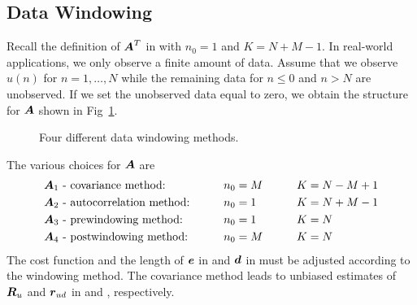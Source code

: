 \subsection{Data Windowing}
Recall the definition of $\boldsymbol{A}^T$ in  with $n_0=1$ and $K=N+M-1$.
\bmathnt
{}
\emathnt
In real-world applications, we only observe a finite amount of data. Assume that we observe $u(n)$ for $n=1,\ldots,N$ while the remaining data for $n\leq 0$ and $n>N$ are unobserved. If we set the unobserved data equal to zero, we obtain the structure for $\boldsymbol{A}$ shown in Fig~\ref{fig:ls_windowing}.
\begin{figure}[htbp]
  \centering
  \caption{Four different data windowing methods.}
  \label{fig:ls_windowing}
\end{figure}
The various choices for $\boldsymbol{A}$ are
\begin{alignat*}{3}
  &\boldsymbol{A}_1\text{ - covariance method:}   &\qquad n_0&=M &\qquad K&=N-M+1\\
  &\boldsymbol{A}_2\text{ - autocorrelation method:}  &\qquad n_0&=1 &\quad K&=N+M-1\\
  &\boldsymbol{A}_3\text{ - prewindowing method:} &\qquad n_0&=1 &\quad K&=N    \\
  &\boldsymbol{A}_4\text{ - postwindowing method:}&\qquad n_0&=M &\quad K&=N
\end{alignat*}
The cost function and the length of $\boldsymbol{e}$ in  and $\boldsymbol{d}$ in  must be adjusted according to the windowing method. The covariance method leads to unbiased estimates of $\boldsymbol{R}_u$ and $\boldsymbol{r}_{ud}$ in  and , respectively.
